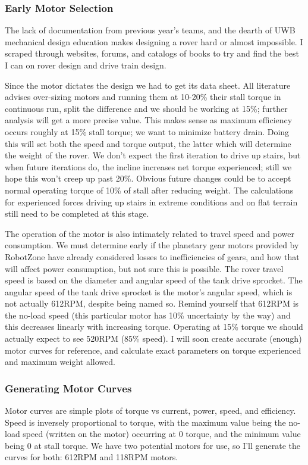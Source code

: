 \documentclass[a4paper, 10pt]{article}
\begin{document}
		\subsubsection*{Early Motor Selection}
		The lack of documentation from previous year's teams, and the dearth of UWB mechanical design education makes designing a rover hard or almost impossible. I scraped through websites, forums, and catalogs of books to try and find the best I can on rover design and drive train design. 
	
		Since the motor dictates the design we had to get its data sheet. All literature advises over-sizing motors and running them at 10-20\% their stall torque in continuous run, split the difference and we should be working at 15\%; further analysis will get a more precise value. This makes sense as maximum efficiency occurs roughly at 15\% stall torque; we want to minimize battery drain. Doing this will set both the speed and torque output, the latter which will determine the weight of the rover. We don't expect the first iteration to drive up stairs, but when future iterations do, the incline increases net torque experienced; still we hope this won't creep up past 20\%. Obvious future changes could be to accept normal operating torque of 10\% of stall after reducing weight. The calculations for experienced forces driving up stairs in extreme conditions and on flat terrain still need to be completed at this stage.
		
		The operation of the motor is also intimately related to travel speed and power consumption. We must determine early if the planetary gear motors provided by RobotZone have already considered losses to inefficiencies of gears, and how that will affect power consumption, but not sure this is possible. The rover travel speed is based on the diameter and angular speed of the tank drive sprocket. The angular speed of the tank drive sprocket is the motor's angular speed, which is not actually 612RPM, despite being named so. Remind yourself that 612RPM is the no-load speed (this particular motor has 10\% uncertainty by the way) and this decreases linearly with increasing torque. Operating at 15\% torque we should actually expect to see 520RPM (85\% speed). I will soon create accurate (enough) motor curves for reference, and calculate exact parameters on torque experienced and maximum weight allowed. 
		
		\subsubsection*{Generating Motor Curves}
		Motor curves are simple plots of torque vs current, power, speed, and efficiency. Speed is inversely proportional to torque, with the maximum value being the no-load speed (written on the motor) occurring at 0 torque, and the minimum value being 0 at stall torque. We have two potential motors for use, so I'll generate the curves for both: 612RPM and 118RPM motors.
		
\end{document}
